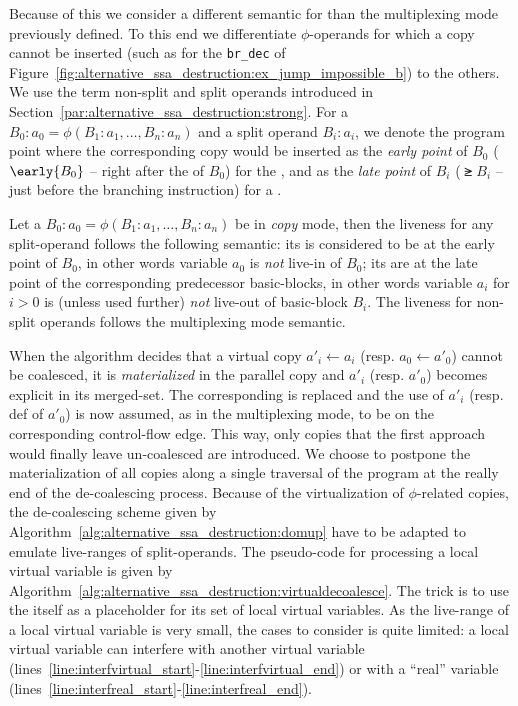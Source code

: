 Because of this we consider a different semantic for \phifuns than the multiplexing mode previously defined. To this end we differentiate $\phi$-operands for which a copy cannot be inserted (such as for the \texttt{br\_dec} of Figure~\ref{fig:alternative_ssa_destruction:ex_jump_impossible_b}) to the others. We use the term non-split and split operands introduced in Section~\ref{par:alternative_ssa_destruction:strong}. For a \phifun $B_0:a_0=\phi(B_1:a_1,\dots,B_n:a_n)$ and a split operand $B_i:a_i$, we denote the  program point where the corresponding copy would be inserted as the \emph{early point} of $B_0$ ($\early{B_0}$ -- right after the \phifuns of $B_0$) for the , and as the \emph{late point} of $B_i$ ($\late{B_i}$ -- just before the branching instruction) for a \useop.
\begin{definition}
Let a \phifun $B_0:a_0=\phi(B_1:a_1,\dots,B_n:a_n)$ be in \emph{copy} mode, then the liveness for any split-operand follows the following semantic: its  is considered to be at the early point of $B_0$, in other words variable $a_0$ is \emph{not} live-in of $B_0$; its \useops are at the late point of the corresponding predecessor basic-blocks, in other words variable $a_i$ for $i>0$ is (unless used further) \emph{not} live-out of basic-block $B_i$. The liveness for non-split operands follows the multiplexing mode semantic. 
\end{definition}

When the algorithm decides that a virtual copy $a'_i \gets a_i$ (resp. $a_0 \gets a'_0$)  cannot be coalesced, it is \emph{materialized} in the parallel copy and $a'_i$ (resp. $a'_0$) becomes explicit in its merged-set. 
The corresponding \phiop is replaced and the use of $a'_i$ (resp. def of $a'_0$) is now assumed, as in the multiplexing mode, to be on the corresponding control-flow edge. 
This way, only copies that the first approach would finally leave un-coalesced are introduced. We choose to postpone the materialization of
all copies along a single traversal of the program at the really end of the de-coalescing process. 
%
Because of the virtualization of $\phi$-related copies, the de-coalescing scheme given by Algorithm~\ref{alg:alternative_ssa_destruction:domup} have to be adapted to emulate live-ranges of split-operands. The pseudo-code for processing a local virtual variable is given by Algorithm~\ref{alg:alternative_ssa_destruction:virtualdecoalesce}. The trick is to use the \phifun itself as a placeholder for its set of local virtual variables. As the live-range of a local virtual variable is very small, the cases to consider is quite limited: a local virtual variable can interfere with another virtual variable (lines~\ref{line:interfvirtual_start}-\ref{line:interfvirtual_end}) or with a ``real'' variable (lines~\ref{line:interfreal_start}-\ref{line:interfreal_end}).

